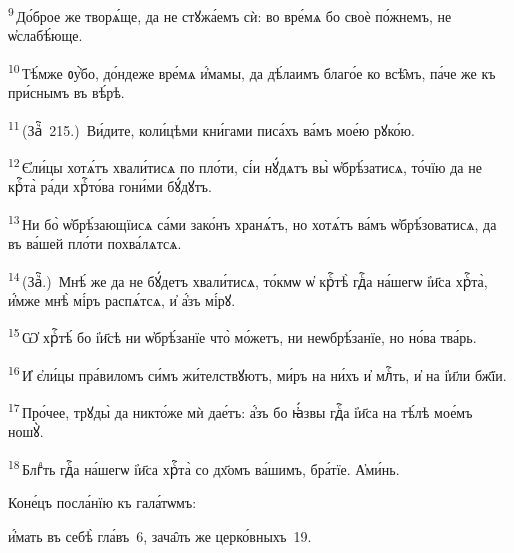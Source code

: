 \textsuperscript{9}\,До́брое же творѧ́ще, да не стꙋжа́емъ сѝ: во вре́мѧ бо своѐ по́жнемъ, не ѡ҆слабѣ́юще.

\textsuperscript{10}\,Тѣ́мже ᲂу҆̀бо, до́ндеже вре́мѧ и҆́мамы, да дѣ́лаимъ благо́е ко всѣ̑мъ, па́че же къ при́снымъ въ вѣ́рѣ.

\textsuperscript{11}\,(Заⷱ҇~215.)~Ви́дите, коли́цѣми кни́гами писа́хъ ва́мъ мое́ю рꙋко́ю.

\textsuperscript{12}\,Є҆ли́цы хотѧ́тъ хвали́тисѧ по пло́ти, сі́и нꙋ́дѧтъ вы̀ ѡ҆брѣ́затисѧ, то́чїю да не крⷭ҇та̀ ра́ди хрⷭ҇то́ва гони́ми бꙋ́дꙋтъ.

\textsuperscript{13}\,Ни бо̀ ѡ҆брѣ́зающїисѧ са́ми зако́нъ хранѧ́тъ, но хотѧ́тъ ва́мъ ѡ҆брѣ́зоватисѧ, да въ ва́шей пло́ти похва́лѧтсѧ.

\textsuperscript{14}\,(Заⷱ҇.)~Мнѣ́ же да не бꙋ́детъ хвали́тисѧ, то́кмѡ ѡ҆ крⷭ҇тѣ̀ гдⷭ҇а на́шегѡ і҆и҃са хрⷭ҇та̀, и҆́мже мнѣ̀ мі́ръ распѧ́тсѧ, и҆ а҆́зъ мі́рꙋ.

\textsuperscript{15}\,Ѡ҆ хрⷭ҇тѣ́ бо і҆и҃сѣ ни ѡ҆брѣ́занїе что̀ мо́жетъ, ни неѡбрѣ́занїе, но но́ва тва́рь.

\textsuperscript{16}\,И҆ є҆ли́цы пра́виломъ си́мъ жи́телствꙋютъ, ми́ръ на ни́хъ и҆ млⷭ҇ть, и҆ на і҆и҃ли бж҃їи.

\textsuperscript{17}\,Про́чее, трꙋды̀ да никто́же мѝ дае́тъ: а҆́зъ бо ꙗ҆́звы гдⷭ҇а і҆и҃са на тѣ́лѣ мое́мъ ношꙋ̀.

\textsuperscript{18}\,Блгⷣть гдⷭ҇а на́шегѡ і҆и҃са хрⷭ҇та̀ со дх҃омъ ва́шимъ, бра́тїе. А҆ми́нь.

\begin{center}{\small Коне́цъ посла́нїю къ гала́тѡмъ:

и҆́мать въ себѣ̀ гла́въ~6, зача̑лъ же церко́вныхъ~19.}\end{center}